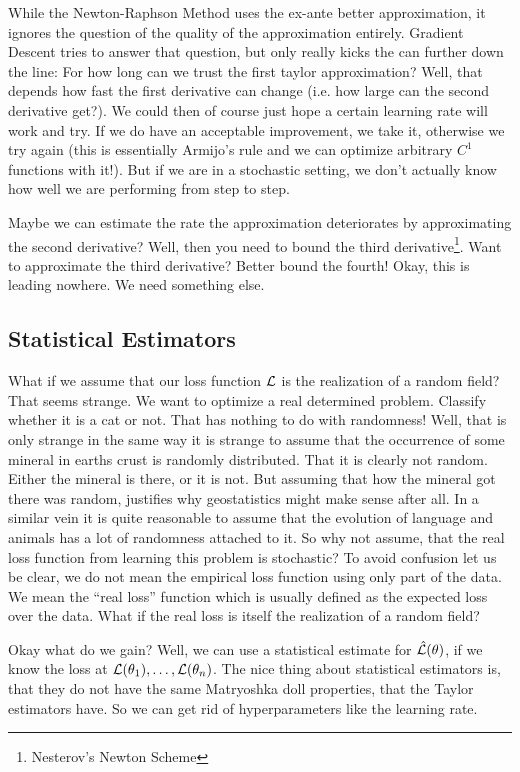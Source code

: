 While the Newton-Raphson Method uses the ex-ante better approximation, it
ignores the question of the quality of the approximation entirely. Gradient
Descent tries to answer that question, but only really kicks the can further
down the line: For how long can we trust the first taylor approximation? Well,
that depends how fast the first derivative can change (i.e. how large can the
second derivative get?). We could then of course just hope a certain learning
rate will work and try. If we do have an acceptable improvement, we take it,
otherwise we try again (this is essentially Armijo's rule and we can optimize
arbitrary \(C^1\) functions with it!). But if we are in a stochastic setting, we
don't actually know how well we are performing from step to step.


Maybe we can estimate the rate the approximation deteriorates by
approximating the second derivative? Well, then you need to bound the third
derivative\footnote{Nesterov's Newton Scheme}. Want
to approximate the third derivative? Better bound the fourth!  Okay, this is
leading nowhere. We need something else.

\subsection{Statistical Estimators}

What if we assume that our loss function \(\mathcal{L}\) is the
realization of a random field? That seems strange. We want to optimize a real
determined problem. Classify whether it is a cat or not. That has nothing to do
with randomness! Well, that is only strange in the same way it is strange to
assume that the occurrence of some mineral in earths crust is randomly
distributed.  That it is clearly not random. Either the mineral is there, or it
is not. But assuming that how the mineral got there was random, justifies why
geostatistics might make sense after all. In a similar vein it is quite
reasonable to assume that the evolution of language and animals has a lot of
randomness attached to it. So why not assume, that the real loss function from
learning this problem is stochastic? To avoid confusion let us be clear, we do
not mean the empirical loss function using only part of the data. We mean the
``real loss'' function which is usually defined as the expected loss over the
data. What if the real loss is itself the realization of a random field?

Okay what do we gain? Well, we can use a statistical estimate for
\(\hat{\mathcal{L}}(\theta)\), if we know the loss at
\(\mathcal{L}(\theta_1),\dots,\mathcal{L}(\theta_n)\). The nice thing about statistical
estimators is, that they do not have the same Matryoshka doll properties, that
the Taylor estimators have. So we can get rid of hyperparameters like the
learning rate.


